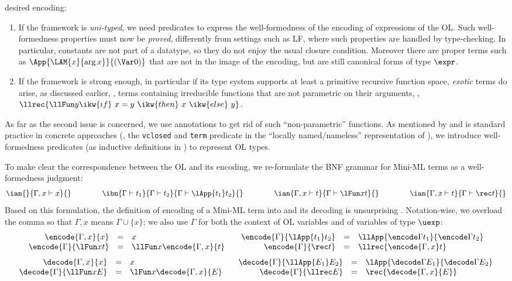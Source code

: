 \documentclass[final]{svjour3}
\begin{document}
desired encoding:
\begin{enumerate}
\item If the framework is \emph{uni-typed}, we need predicates to
  express the well-formedness of the encoding of expressions of
  the OL\@. Such well-formedness properties must now be \emph{proved}, 
  differently from settings such as LF, where such properties are
  handled by type-checking.  In particular,
  \hybrid constants are not part of a datatype, so they do not enjoy
  the usual closure condition. Moreover there are proper \hybrid terms
  such as $\App {\LAM{x}{\arg{x}}} {(\Var 0)}$ that are not in the
  image of the encoding, but are still canonical forms of type
  $\expr$.

\item If the framework is strong enough, in particular if its type
  system supports at least a primitive recursive function space, 
 \emph{exotic} terms do arise, as discussed earlier, \ie, terms
  containing irreducible functions that are not parametric on their
  arguments, \eg, $\llrec {\llFun y {\ikw{if} \ x = y\ \ikw{then} \ x\
  \ikw{else}\ y}}$.
\end{enumerate}
As far as the second issue is concerned, we use 
annotations to get rid of such ``non-parametric'' functions.  
As mentioned by \cite{Pfenning99handbook} and is standard
practice in concrete approaches (\eg, the \texttt{vclosed} and
\texttt{term} predicate in the ``locally 
named/nameless'' representation of \cite{McKinna99,ACPPW07}), we 
introduce well-formedness predicates (as inductive
definitions in \HOL) to represent OL types.


To make clear the correspondence between the OL and its encoding, we
re-formulate the BNF grammar for Mini-ML terms as a well-formedness
judgment:
\begin{eqnarray*}
  \ian{}{\Gamma,x\vdash x}{}
\qquad\qquad
\ibn{\Gamma\vdash t_1}{\Gamma\vdash t_2}
    {\Gamma\vdash\lApp {t_1} t_2}{}
\qquad\qquad
\ian{\Gamma,x\vdash t}
    {\Gamma\vdash\lFun x t}{}
\qquad\qquad
\ian{\Gamma,x\vdash t}
    {\Gamma\vdash\rec t}{}
\end{eqnarray*}
Based on this formulation,
the definition of encoding of a Mini-ML term into \hybrid and its
decoding is unsurprising \cite{Pfenning01book}.  Notation-wise, we overload the
comma so that $\Gamma,x$ means $\Gamma\cup \{x\}$; we also use
$\Gamma$ for both the context of OL variables and of \hybrid variables
of type $\uexp$:
\[
\begin{array}{rcl@{\qquad}rcl}
  \encode{\Gamma,x}{x}& = & x&
\encode{\Gamma}{\lApp {t_1} t_2} & =& \llApp{\encode \Gamma {t_1}}{\encode
  \Gamma {t_2}} \\
\encode{\Gamma}{\lFun x t}& =&\llFun x {\encode{\Gamma,x}{t}} 
&\encode{\Gamma}{\rec t} &=&\llrec {\encode{\Gamma,x} t} 
\end{array}\]
\[
\begin{array}{rcl@{\qquad}rcl}
  \decode{\Gamma,x}{{x}}& = & x&
\decode{\Gamma}{\llApp {E_1} E_2} & =& \lApp{\decode \Gamma {E_1}}{\decode
  \Gamma {E_2}} \\
\decode{\Gamma}{\llFun x E}& =&\lFun x {\decode{\Gamma,x}{E}} 
&\decode{\Gamma}{\llrec E} &=&\rec {\decode{\Gamma,x}{E}} 
\end{array}\]
\end{document}
